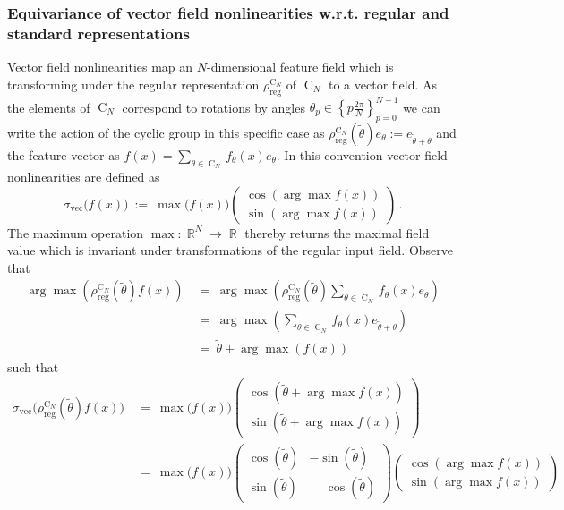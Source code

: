\documentclass{article}
\DeclareMathOperator*{\R}{\mathbb{R}}
\newcommand{\CN}{\ensuremath{\operatorname{C}_{\!N}}}
\begin{document}
\subsubsection{Equivariance of vector field nonlinearities w.r.t. regular and standard representations}
\label{apx:equivariance_nonlin_vector}


Vector field nonlinearities map an $N$-dimensional feature field which is transforming under the regular representation $\rho_\text{reg}^{\CN}$ of $\CN$ to a vector field.
As the elements of $\CN$ correspond to rotations by angles $\theta_p\in\left\{p\frac{2\pi}{N}\right\}_{p=0}^{N-1}$ we can write the action of the cyclic group in this specific case as
$\rho_\text{reg}^{\CN}(\tilde{\theta}) e_\theta := e_{\tilde{\theta}+\theta}$
and the feature vector as
$f(x)=\sum\limits_{\theta\in\CN} f_\theta(x)e_\theta$.
In this convention vector field nonlinearities are defined as
\[
    \sigma_\text{vec}\big(f(x)\big)\ :=\ \max\big(f(x)\big) \begin{pmatrix} \cos(\arg\max f(x)) \\ \sin(\arg\max f(x)) \end{pmatrix} \,.
\]
The maximum operation $\max:\R^N\to\R$ thereby returns the maximal field value which is invariant under transformations of the regular input field.
Observe that
\begin{align*}
         \arg\max\left(\rho_\text{reg}^{\CN}(\tilde{\theta}) f(x)\right)
    \ &=\ \arg\max\left(\rho_\text{reg}^{\CN}(\tilde{\theta}) \sum_{\theta\in\CN} f_\theta(x)e_\theta \right) \\
    \ &=\ \arg\max\left(\sum_{\theta\in\CN} f_\theta(x)e_{\tilde{\theta}+\theta} \right) \\
    \ &=\ \tilde{\theta} + \arg\max\left(f(x) \right)
\end{align*}
such that
\begin{align*}
    \sigma_\text{vec}\big(\rho_\text{reg}^{\CN}(\tilde{\theta}) f(x)\big)
    \ &=\ \max\big(f(x)\big)
            \begin{pmatrix}
                \cos(\tilde{\theta} + \arg\max f(x)) \\
                \sin(\tilde{\theta} + \arg\max f(x))
            \end{pmatrix} \\
    \ &=\ \max\big(f(x)\big)
            \begin{pmatrix}
                \cos(\tilde{\theta}) &          - \sin(\tilde{\theta}) \\
                \sin(\tilde{\theta}) & \phantom{-}\cos(\tilde{\theta})
            \end{pmatrix}
            \begin{pmatrix}
                \cos(\arg\max f(x)) \\
                \sin(\arg\max f(x))
            \end{pmatrix}
\end{align*}
\end{document}
